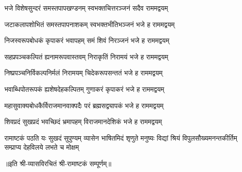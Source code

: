 
\twolineshloka
{भजे विशेषसुन्दरं समस्तपापखण्डनम्}
{स्वभक्तचित्तरञ्जनं सदैव राममद्वयम्}

\twolineshloka
{जटाकलापशोभितं समस्तपापनाशकम्}
{स्वभक्तभीतिभञ्जनं भजे ह राममद्वयम्}

\twolineshloka
{निजस्वरूपबोधकं कृपाकरं भवापहम्}
{समं शिवं निरञ्जनं भजे ह राममद्वयम्}

\twolineshloka
{सहप्रपञ्चकल्पितं ह्यनामरूपवास्तवम्}
{निराकृतिं निरामयं भजे ह राममद्वयम्}

\twolineshloka
{निष्प्रपञ्चनिर्विकल्पनिर्मलं निरामयम्}
{चिदेकरूपसन्ततं भजे ह राममद्वयम्}

\twolineshloka
{भवाब्धिपोतरूपकं ह्यशेषदेहकल्पितम्}
{गुणाकरं कृपाकरं भजे ह राममद्वयम्}

\twolineshloka
{महासुवाक्यबोधकैर्विराजमानवाक्पदैः}
{परं ब्रह्मसद्व्यापकं भजे ह राममद्वयम्}

\twolineshloka
{शिवप्रदं सुखप्रदं भवच्छिदं भ्रमापहम्}
{विराजमानदेशिकं भजे ह राममद्वयम्}

\fourlineindentedshloka
{रामाष्टकं पठति यः सुखदं सुपुण्यम्}
{व्यासेन भाषितमिदं शृणुते मनुष्यः}
{विद्यां श्रियं विपुलसौख्यमनन्तकीर्तिम्}
{सम्प्राप्य देहविलये लभते च मोक्षम्}

॥इति श्री-व्यासविरचितं श्री-रामाष्टकं सम्पूर्णम्॥